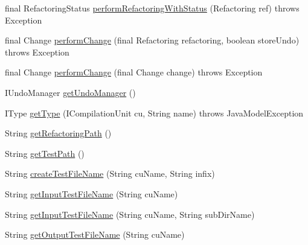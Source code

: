 \begin{DoxyCompactItemize}
\item 
final RefactoringStatus \hyperlink{classorg_1_1eclipse_1_1jdt_1_1ui_1_1tests_1_1refactoring_1_1infra_1_1RefactoringTest_aa9b69d9cda60d60684d46f0e45d37be2}{performRefactoringWithStatus} (Refactoring ref)  throws Exception 
\item 
final Change \hyperlink{classorg_1_1eclipse_1_1jdt_1_1ui_1_1tests_1_1refactoring_1_1infra_1_1RefactoringTest_a04fe3161fb063e19b5732426930c39af}{performChange} (final Refactoring refactoring, boolean storeUndo)  throws Exception 
\item 
final Change \hyperlink{classorg_1_1eclipse_1_1jdt_1_1ui_1_1tests_1_1refactoring_1_1infra_1_1RefactoringTest_a6ea6bd83bc5719c025fc69d0e6da7a9d}{performChange} (final Change change)  throws Exception 
\item 
IUndoManager \hyperlink{classorg_1_1eclipse_1_1jdt_1_1ui_1_1tests_1_1refactoring_1_1infra_1_1RefactoringTest_a298d2cc296a175545a70628d9273d42c}{getUndoManager} ()
\item 
IType \hyperlink{classorg_1_1eclipse_1_1jdt_1_1ui_1_1tests_1_1refactoring_1_1infra_1_1RefactoringTest_a8fbcce8926fd1ff7833765a2874b89bc}{getType} (ICompilationUnit cu, String name)  throws JavaModelException 
\item 
String \hyperlink{classorg_1_1eclipse_1_1jdt_1_1ui_1_1tests_1_1refactoring_1_1infra_1_1RefactoringTest_afc6bcb6bc2b0bf7e8905df2ed83769a0}{getRefactoringPath} ()
\item 
String \hyperlink{classorg_1_1eclipse_1_1jdt_1_1ui_1_1tests_1_1refactoring_1_1infra_1_1RefactoringTest_a717b542658e4905837949967ec6bf68f}{getTestPath} ()
\item 
String \hyperlink{classorg_1_1eclipse_1_1jdt_1_1ui_1_1tests_1_1refactoring_1_1infra_1_1RefactoringTest_ac5cd0510d90a589e8f8ded851ff0d7d0}{createTestFileName} (String cuName, String infix)
\item 
String \hyperlink{classorg_1_1eclipse_1_1jdt_1_1ui_1_1tests_1_1refactoring_1_1infra_1_1RefactoringTest_a310a9883ad6c00b8c08c9ff44e45267c}{getInputTestFileName} (String cuName)
\item 
String \hyperlink{classorg_1_1eclipse_1_1jdt_1_1ui_1_1tests_1_1refactoring_1_1infra_1_1RefactoringTest_a096f8b85540de7624d7616f95f5e450a}{getInputTestFileName} (String cuName, String subDirName)
\item 
String \hyperlink{classorg_1_1eclipse_1_1jdt_1_1ui_1_1tests_1_1refactoring_1_1infra_1_1RefactoringTest_a42b3a2518506c36f6ca6d91483f89551}{getOutputTestFileName} (String cuName)
\item 

\end{DoxyCompactItemize}
